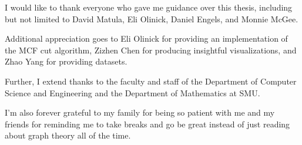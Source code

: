 I would like to thank everyone who gave me guidance over this thesis, including but not limited to David Matula, Eli Olinick, Daniel Engels, and Monnie McGee.

Additional appreciation goes to Eli Olinick for providing an implementation of the MCF cut algorithm, Zizhen Chen for producing insightful visualizations, and Zhao Yang for providing datasets.

Further, I extend thanks to the faculty and staff of the Department of Computer Science and Engineering and the Department of Mathematics at SMU.

I'm also forever grateful to my family for being so patient with me and my friends for reminding me to take breaks and go be great instead of just reading about graph theory all of the time. 